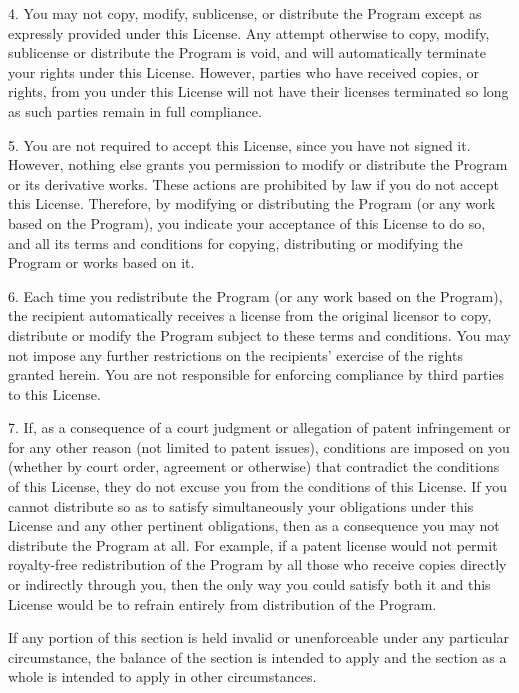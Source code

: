 \item{4.} You may not copy, modify, sublicense, or distribute the
Program except as expressly provided under this License.  Any attempt
otherwise to copy, modify, sublicense or distribute the Program is void,
and will automatically terminate your rights under this License.
However, parties who have received copies, or rights, from you under
this License will not have their licenses terminated so long as such
parties remain in full compliance.

\item{5.} You are not required to accept this License, since you have
not signed it.  However, nothing else grants you permission to modify or
distribute the Program or its derivative works.  These actions are
prohibited by law if you do not accept this License.  Therefore, by
modifying or distributing the Program (or any work based on the
Program), you indicate your acceptance of this License to do so, and all
its terms and conditions for copying, distributing or modifying the
Program or works based on it.

\item{6.} Each time you redistribute the Program (or any work based on
the Program), the recipient automatically receives a license from the
original licensor to copy, distribute or modify the Program subject to
these terms and conditions.  You may not impose any further restrictions
on the recipients' exercise of the rights granted herein.  You are not
responsible for enforcing compliance by third parties to this License.

\item{7.} If, as a consequence of a court judgment or allegation of
patent infringement or for any other reason (not limited to patent
issues), conditions are imposed on you (whether by court order,
agreement or otherwise) that contradict the conditions of this License,
they do not excuse you from the conditions of this License.  If you
cannot distribute so as to satisfy simultaneously your obligations under
this License and any other pertinent obligations, then as a consequence
you may not distribute the Program at all.  For example, if a patent
license would not permit royalty-free redistribution of the Program by
all those who receive copies directly or indirectly through you, then
the only way you could satisfy both it and this License would be to
refrain entirely from distribution of the Program.

\item{}If any portion of this section is held invalid or unenforceable
under any particular circumstance, the balance of the section is
intended to apply and the section as a whole is intended to apply in
other circumstances.

